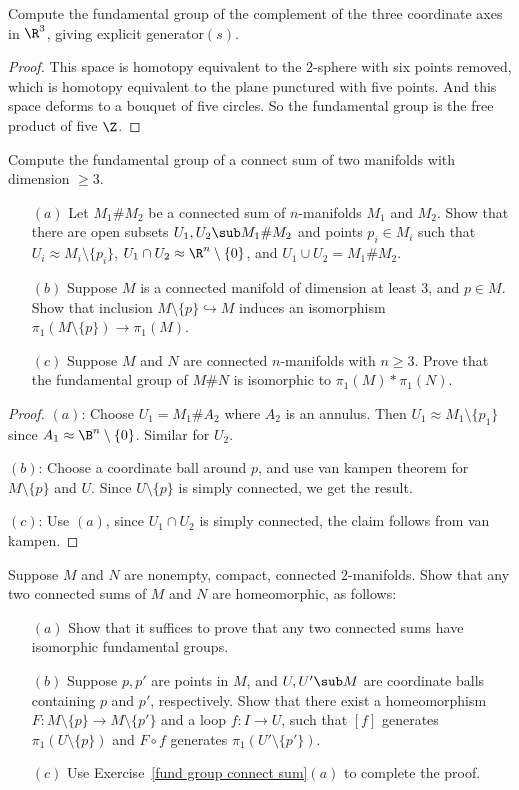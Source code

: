 \begin{exercise}
Compute the fundamental group of the complement of the three coordinate axes in $\R^3$, giving explicit generator$(s)$.
\end{exercise}
\begin{proof}
This space is homotopy equivalent to the $2$-sphere with six points removed, which is homotopy equivalent to the plane punctured with five points. And this space deforms to a bouquet of five circles. So the fundamental group is the free product of five $\Z$.
\end{proof}
\begin{exercise}\label{fund group connect sum}
Compute the fundamental group of a connect sum of two manifolds with dimension $\geq 3$.
\begin{itemize}
\item[$(a)$] Let $M_1\#M_2$ be a connected sum of $n$-manifolds $M_1$ and $M_2$. Show that there are open subsets $U_1,U_2\sub M_1\#M_2$ and points $p_i\in M_i$ such that $U_i\approx M_i\setminus\{p_i\}$, $U_1\cap U_2\approx\R^n\setminus\{0\}$, and $U_1\cup U_2=M_1\#M_2$.
\item[$(b)$] Suppose $M$ is a connected manifold of dimension at least $3$, and $p\in M$. Show that inclusion $M\setminus\{p\}\hookrightarrow M$ induces an isomorphism $\pi_1(M\setminus\{p\})\to\pi_1(M)$.
\item[$(c)$] Suppose $M$ and $N$ are connected $n$-manifolds with $n\geq 3$. Prove that the fundamental group of $M\#N$ is isomorphic to $\pi_1(M)\ast\pi_1(N)$.
\end{itemize}
\end{exercise}
\begin{proof}
$(a)$: Choose $U_1=M_1\#A_2$ where $A_2$ is an annulus. Then $U_1\approx M_1\setminus\{p_1\}$ since $A_1\approx\B^n\setminus\{0\}$. Similar for $U_2$.\par
$(b)$: Choose a coordinate ball around $p$, and use van kampen theorem for $M\setminus\{p\}$ and $U$. Since $U\setminus\{p\}$ is simply connected, we get the result.\par
$(c)$: Use $(a)$, since $U_1\cap U_2$ is simply connected, the claim follows from van kampen.
\end{proof}
\begin{exercise}
Suppose $M$ and $N$ are nonempty, compact, connected $2$-manifolds. Show that any two connected sums of $M$ and $N$ are homeomorphic, as follows:
\begin{itemize}
\item[$(a)$] Show that it suffices to prove that any two connected sums have isomorphic fundamental groups.
\item[$(b)$] Suppose $p,p'$ are points in $M$, and $U,U'\sub M$ are coordinate balls containing $p$ and $p'$, respectively. Show that there exist a homeomorphism
$F:M\setminus\{p\}\to M\setminus\{p'\}$ and a loop $f:I\to U$, such that $[f]$ generates $\pi_1(U\setminus\{p\})$ and $F\circ f$ generates $\pi_1(U'\setminus\{p'\})$.
\item[$(c)$] Use Exercise~\ref{fund group connect sum}$(a)$ to complete the proof.
\end{itemize}
\end{exercise}
